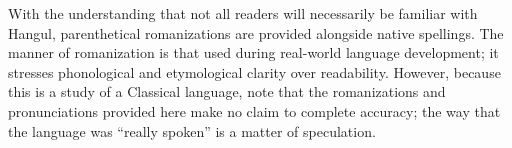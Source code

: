 With the understanding that not all readers will necessarily be familiar with Hangul, parenthetical romanizations are provided alongside native spellings.
The manner of romanization is that used during real-world language development; it stresses phonological and etymological clarity over readability.
However, because this is a study of a Classical language, note that the romanizations and pronunciations provided here make no claim to complete accuracy; the way that the language was “really spoken” is a matter of speculation.
